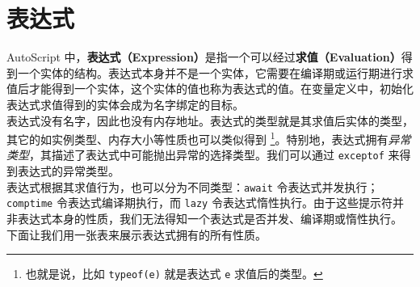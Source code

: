 

\section{表达式}

AutoScript 中，\textbf{表达式（Expression）}是指一个可以经过\textbf{求值（Evaluation）}得到一个实体的结构。表达式本身并不是一个实体，它需要在编译期或运行期进行求值后才能得到一个实体，这个实体的值也称为表达式的值。在变量定义中，初始化表达式求值得到的实体会成为名字绑定的目标。 \\

表达式没有名字，因此也没有内存地址。表达式的类型就是其求值后实体的类型，其它的如实例类型、内存大小等性质也可以类似得到 \footnote[3]{也就是说，比如 \lstinline!typeof(e)! 就是表达式 \lstinline!e! 求值后的类型。}。特别地，表达式拥有\emph{异常类型}，其描述了表达式中可能抛出异常的选择类型。我们可以通过 \lstinline!exceptof! 来得到表达式的异常类型。 \\

表达式根据其求值行为，也可以分为不同类型：\lstinline!await! 令表达式并发执行；\lstinline!comptime! 令表达式编译期执行，而 \lstinline!lazy! 令表达式惰性执行。由于这些提示符并非表达式本身的性质，我们无法得知一个表达式是否并发、编译期或惰性执行。 \\

下面让我们用一张表来展示表达式拥有的所有性质。


